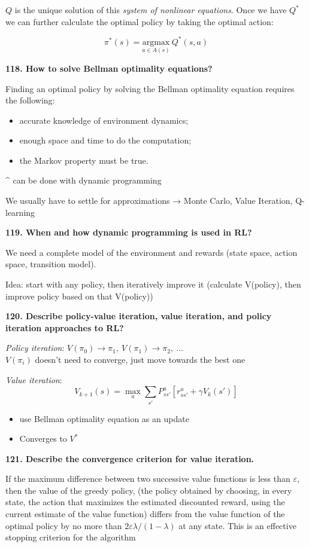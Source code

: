 $Q$ is the unique solution of this \emph{system of nonlinear equations}.
Once we have $Q^*$ we can further calculate the optimal policy by taking
the optimal action:

\[ \pi^*(s) = \underset{a \in A(s)}{\text{argmax}}\ Q^*(s,a)\]

\textbf{118. How to solve Bellman optimality equations?}

Finding an optimal policy by solving the Bellman optimality equation
requires the following:

\begin{itemize}
\item accurate knowledge of environment dynamics;
\item enough space and time to do the computation;
\item the Markov property must be true.
\end{itemize}

\^{} can be done with dynamic programming

We usually have to settle for approximations → Monte Carlo, Value
Iteration, Q-learning

\textbf{119. When and how dynamic programming is used in RL?}

We need a complete model of the environment and rewards (state space,
action space, transition model).

Idea: start with any policy, then iteratively improve it (calculate
V(policy), then improve policy based on that V(policy))

\textbf{120. Describe policy-value iteration, value iteration, and
policy iteration approaches to RL?}

\textit{Policy iteration}: $V(\pi_0) \to \pi_1,\ V(\pi_1) \to \pi_2,\ \dots$ \\
$V(\pi_i)$ doesn't need to converge, just move towards the best one

\textit{Value iteration}:
\[ V_{k+1} (s) = \max_a \sum_{s'} P_{ss'}^a \left[ r_{ss'}^a + \gamma V_k(s') \right]\]

\begin{itemize}
\item use Bellman optimality equation as an update
\item Converges to $V^*$
\end{itemize}

\textbf{121. Describe the convergence criterion for value iteration.}

If the maximum difference between two successive value functions is less
than $\varepsilon$, then the value of the greedy policy, (the policy obtained by
choosing, in every state, the action that maximizes the estimated
discounted reward, using the current estimate of the value function)
differs from the value function of the optimal policy by no more than 
$2\varepsilon \lambda/(1-\lambda )$ at any state. This is an effective stopping 
criterion for the algorithm

